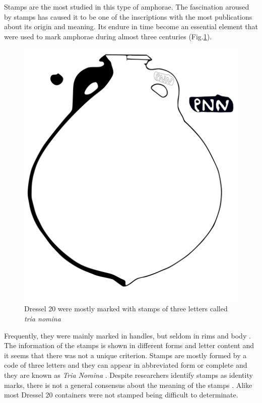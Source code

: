 \documentclass[review]{elsarticle}
\begin{document}
Stamps are the most studied in this type of amphorae. The fascination aroused by stamps has caused it to be one of the inscriptions with the most publications about its origin and meaning. Its endure in time become an essential element that were used to mark amphorae during almost three centuries \citep{remesal_sellar_2016} (Fig.\ref{amphora}). 

\begin{figure}[htp]
	\centering
\includegraphics[scale=0.5]{figs/dressel20}
\caption{Dressel 20 were mostly marked with stamps of three letters called \textit{tria nomina}}
\label{amphora}
\end{figure} 

Frequently, they were mainly marked  in handles, but seldom in rims and body \citep{millet_anforas_1998}. 
The information of the stamps is shown in different forms and letter content and it seems that there was not a unique criterion. Stamps are mostly formed by a code of three letters and they can appear in abbreviated form or complete and they are known as \textit{Tria Nomina} \citep{berni_millet_amphora_1996}. Despite researchers identify stamps as identity marks, there is not a general consensus about the meaning of the stamps \citep{rodriguez_baetican_1998}. Alike most Dressel 20 containers were not stamped being difficult to determinate. 
\end{document}
